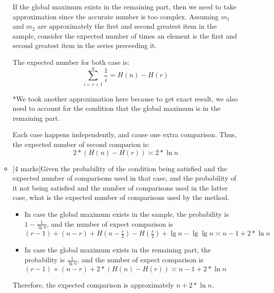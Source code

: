\documentclass[12pt]{article}
\begin{document}
\begin{enumerate}
\begin{itemize}
If the global maximum exists in the remaining part, then we need to take approximation since the accurate number is too complex. Assuming $m_{1}$ and $m_{2}$ are approximately the first and second greatest item in the sample, consider the expected number of times an element is the first and second greatest item in the series preceeding it.

The expected number for both case is:
\begin{equation}
\sum_{i = r + 1}^{n}\frac{1}{i} = H(n) - H(r)
\end{equation}

*We took another approximation here because to get exact result, we also need to account for the condition that the global maximum is in the remaining part.

Each case happens independently, and cause one extra comparison. Thus, the expected number of second comparion is:
\begin{equation}
2 * (H(n) - H(r)) \asymp 2 * \ln n
\end{equation}

\item{}[4 marks]Given the probability of the condition being satisfied and the expected number of comparisons used in that case, and the probability of it not being satisfied and the number of comparisons used in the latter case, what is the expected number of comparisons used by the method.

\begin{itemize}
\item{} In case the global maximum exists in the sample, the probability is $1 - \frac{1}{\lg n}$, and the number of expect comparison is $(r - 1) + (n - r) + H(n - \frac{r}{2}) - H(\frac{r}{2}) + \lg n - \lg \lg n \asymp n - 1 + 2 * \ln n$
\item{} In case the global maximum exists in the remaining part, the probability is $\frac{1}{\lg n}$, and the number of expect comparison is $(r - 1) + (n - r) + 2 * (H(n) - H(r)) \asymp n - 1 + 2 * \ln n$
\end{itemize}

Therefore, the expected comparison is approximately $n + 2 * \ln n$.


\end{itemize}


\end{enumerate}
\end{document}

